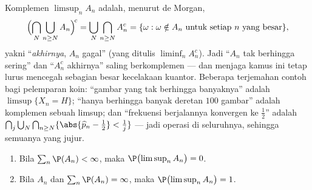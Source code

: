 \begin{example}\label{ex:b2:proba:limsuplang}
Komplemen $\limsup_nA_n$ adalah, menurut de Morgan,
\[
\Bigl(\bigcap_N\bigcup_{n\geq N}A_n\Bigr)^{\!c}
= \bigcup_N\bigcap_{n\geq N}A_n^c
= \{\omega : \omega \notin A_n \text{ untuk setiap } n \text{ yang besar}\},
\]
yakni  ``\emph{akhirnya}, $A_n$ gagal'' (yang ditulis
$\liminf_nA_n^c$). Jadi ``$A_n$ tak berhingga sering'' dan
``$A_n^c$ akhirnya'' saling berkomplemen --- dan menjaga
kamus ini tetap lurus mencegah sebagian besar kecelakaan kuantor.
Beberapa terjemahan contoh bagi pelemparan koin: ``gambar yang
tak berhingga banyaknya'' adalah $\limsup\{X_n = H\}$; ``hanya berhingga banyak deretan
$100$ gambar'' adalah komplemen sebuah limsup; dan ``frekuensi
berjalannya konvergen ke $\frac12$'' adalah
$\bigcap_j\bigcup_N\bigcap_{n\geq N}\{\abs{\widehat p_n -
\tfrac12} < \tfrac1j\}$ --- jadi operasi  di seluruhnya,
sehingga semuanya  yang jujur.
\end{example}

\begin{theorem}\label{thm:b2:proba:borelcantelli}
\leavevmode
\begin{enumerate}
\item Bila $\sum_{n} \P(A_n) < \infty$, maka
$\P\bigl(\limsup_n A_n\bigr) = 0$.
\item Bila  $A_n$  dan $\sum_n \P(A_n) =
\infty$, maka $\P\bigl(\limsup_n A_n\bigr) = 1$.
\end{enumerate}
\end{theorem}

